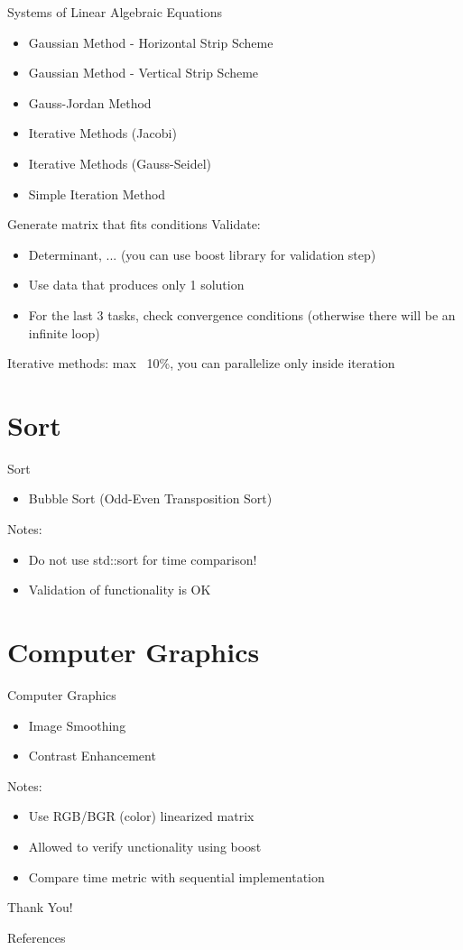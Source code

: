 \documentclass{beamer}
\begin{document}
\begin{frame}{Systems of Linear Algebraic Equations}
  \begin{itemize}
    \item Gaussian Method - Horizontal Strip Scheme
    \item Gaussian Method - Vertical Strip Scheme
    \item Gauss-Jordan Method
    \item Iterative Methods (Jacobi)
    \item Iterative Methods (Gauss-Seidel)
    \item Simple Iteration Method
  \end{itemize}
  Generate matrix that fits conditions
  Validate:
  \begin{itemize}
    \item Determinant, ... (you can use boost library for validation step)
    \item Use data that produces only 1 solution
    \item For the last 3 tasks, check convergence conditions (otherwise there will be an infinite loop)
  \end{itemize}
  Iterative methods: max ~10\%, you can parallelize only inside iteration
\end{frame}

\section{Sort}

\begin{frame}{Sort}
  \begin{itemize}
    \item Bubble Sort (Odd-Even Transposition Sort)
  \end{itemize}
  Notes:
  \begin{itemize}
    \item Do not use std::sort for time comparison!
    \item Validation of functionality is OK
  \end{itemize}
\end{frame}

\section{Computer Graphics}

\begin{frame}{Computer Graphics}
  \begin{itemize}
    \item Image Smoothing
    \item Contrast Enhancement
  \end{itemize}
  Notes:
  \begin{itemize}
    \item Use RGB/BGR (color) linearized matrix
    \item Allowed to verify unctionality using boost
    \item Compare time metric with sequential implementation
  \end{itemize}
\end{frame}

\begin{frame}
    \centering
    \Huge{Thank You!}
\end{frame}

\begin{frame}{References}
\end{frame}
\end{document}
